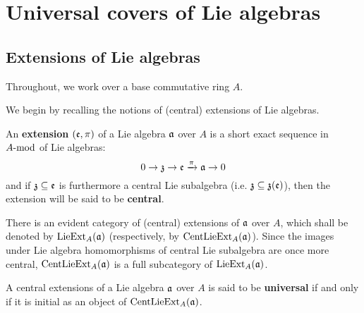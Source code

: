 \section{Universal covers of Lie algebras}
    \subsection{Extensions of Lie algebras}
        \begin{convention}
            Throughout, we work over a base commutative ring $A$.
        \end{convention}

        We begin by recalling the notions of (central) extensions of Lie algebras.
        \begin{definition} \label{def: lie_algebra_extensions}
            An \textbf{extension} $(\frake, \pi)$ of a Lie algebra $\a$ over $A$ is a short exact sequence in $A\mod$ of Lie algebras:
                $$0 \to \z \to \frake \xrightarrow[]{\pi} \a \to 0$$
            and if $\z \subseteq \frake$ is furthermore a central Lie subalgebra (i.e. $\z \subseteq \z(\frake)$), then the extension will be said to be \textbf{central}.

            There is an evident category of (central) extensions of $\a$ over $A$, which shall be denoted by $\Lie\Ext_A(\a)$ (respectively, by $\Cent\Lie\Ext_A(\a)$). Since the images under Lie algebra homomorphisms of central Lie subalgebra are once more central, $\Cent\Lie\Ext_A(\a)$ is a full subcategory of $\Lie\Ext_A(\a)$.
        \end{definition}
        \begin{definition} \label{def: universal_central_extensions_of_lie_algebras} 
            A central extensions of a Lie algebra $\a$ over $A$ is said to be \textbf{universal} if and only if it is initial as an object of $\Cent\Lie\Ext_A(\a)$. 
        \end{definition}
        
